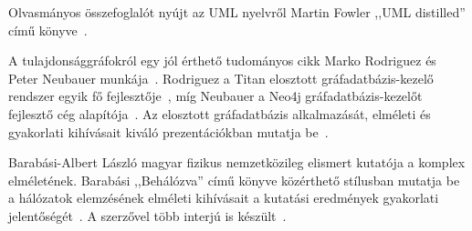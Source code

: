 Olvasmányos összefoglalót nyújt az UML nyelvről Martin Fowler ,,UML distilled'' című könyve~\cite{fowler1997uml}.

A tulajdonsággráfokról egy jól érthető tudományos cikk Marko Rodriguez és Peter Neubauer munkája~\cite{Rodriguez2010}. Rodriguez a Titan elosztott gráfadatbázis-kezelő rendszer egyik fő fejlesztője~\cite{Titan}, míg Neubauer a Neo4j gráfadatbázis-kezelőt fejlesztő cég alapítója~\cite{Neo4j}. Az elosztott gráfadatbázis alkalmazását, elméleti és gyakorlati kihívásait kiváló prezentációkban mutatja be~\cite{RodriguezSlides2012,RodriguezSlides2013}.

Barabási-Albert László magyar fizikus nemzetközileg elismert kutatója a komplex  elméletének. Barabási ,,Behálózva'' című könyve közérthető stílusban mutatja be a hálózatok elemzésének elméleti kihívásait a kutatási eredmények gyakorlati jelentőségét~\cite{behalozva}. A szerzővel több interjú is készült~\cite{barabasi1,barabasi2,barabasi3}.


